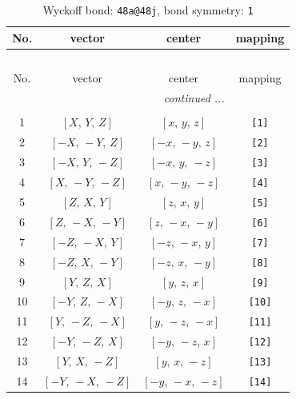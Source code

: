 \documentclass[fleqn,8pt]{jsarticle}
\begin{document}
\begin{longtable}{cccc}
\caption{Wyckoff bond: {\tt 48a@48j}, bond symmetry: {\tt 1}}
 \\
 \hline \hline
No. & vector & center & mapping \\ \hline \endfirsthead

\multicolumn{3}{l}{\tablename\ \thetable{}} \\
 \hline \hline
No. & vector & center & mapping \\ \hline \endhead

 \hline \hline
\multicolumn{3}{r}{\footnotesize\it continued ...} \\ \endfoot

 \hline \hline
\multicolumn{3}{r}{} \\ \endlastfoot

1 & $\left[ X,\, Y,\, Z \right]$ & $\left[ x,\, y,\, z \right]$ & {\tt [1]} \\ \hline
2 & $\left[ - X,\, - Y,\, Z \right]$ & $\left[ - x,\, - y,\, z \right]$ & {\tt [2]} \\ \hline
3 & $\left[ - X,\, Y,\, - Z \right]$ & $\left[ - x,\, y,\, - z \right]$ & {\tt [3]} \\ \hline
4 & $\left[ X,\, - Y,\, - Z \right]$ & $\left[ x,\, - y,\, - z \right]$ & {\tt [4]} \\ \hline
5 & $\left[ Z,\, X,\, Y \right]$ & $\left[ z,\, x,\, y \right]$ & {\tt [5]} \\ \hline
6 & $\left[ Z,\, - X,\, - Y \right]$ & $\left[ z,\, - x,\, - y \right]$ & {\tt [6]} \\ \hline
7 & $\left[ - Z,\, - X,\, Y \right]$ & $\left[ - z,\, - x,\, y \right]$ & {\tt [7]} \\ \hline
8 & $\left[ - Z,\, X,\, - Y \right]$ & $\left[ - z,\, x,\, - y \right]$ & {\tt [8]} \\ \hline
9 & $\left[ Y,\, Z,\, X \right]$ & $\left[ y,\, z,\, x \right]$ & {\tt [9]} \\ \hline
10 & $\left[ - Y,\, Z,\, - X \right]$ & $\left[ - y,\, z,\, - x \right]$ & {\tt [10]} \\ \hline
11 & $\left[ Y,\, - Z,\, - X \right]$ & $\left[ y,\, - z,\, - x \right]$ & {\tt [11]} \\ \hline
12 & $\left[ - Y,\, - Z,\, X \right]$ & $\left[ - y,\, - z,\, x \right]$ & {\tt [12]} \\ \hline
13 & $\left[ Y,\, X,\, - Z \right]$ & $\left[ y,\, x,\, - z \right]$ & {\tt [13]} \\ \hline
14 & $\left[ - Y,\, - X,\, - Z \right]$ & $\left[ - y,\, - x,\, - z \right]$ & {\tt [14]} \\ \hline

\end{longtable}
\end{document}
